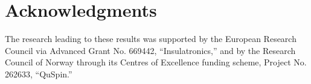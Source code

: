 \documentclass[aps,prl,twocolumn,amsmath,amssymb,nobibnotes]{revtex4-1}%
\begin{document}
\section*{Acknowledgments}
The research leading to these results was supported by the European Research Council via Advanced Grant No. 669442, ``Insulatronics,'' and by the Research Council of Norway through its Centres of Excellence funding scheme, Project No. 262633, ``QuSpin.''




\end{document}
